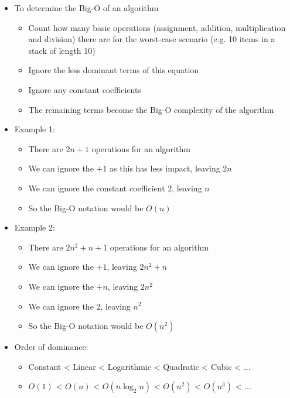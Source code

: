 \begin{itemize}
  \item To determine the Big-O of an algorithm
  \begin{itemize}
    \item Count how many basic operations (assignment, addition, multiplication and division) there are for the worst-case scenario (e.g. 10 items in a stack of length 10)
    \item Ignore the less dominant terms of this equation
    \item Ignore any constant coefficients
    \item The remaining terms become the Big-O complexity of the algorithm
  \end{itemize}
  \item Example 1:
  \begin{itemize}
    \item There are $2n + 1$ operations for an algorithm
    \item We can ignore the $+ 1$ as this has less impact, leaving $2n$
    \item We can ignore the constant coefficient $2$, leaving $n$
    \item So the Big-O notation would be $O(n)$
  \end{itemize}
  \item Example 2:
  \begin{itemize}
    \item There are $2n^2 + n + 1$ operations for an algorithm
    \item We can ignore the $+ 1$, leaving $2n^2 + n$
    \item We can ignore the $+ n$, leaving $2n^2$
    \item We can ignore the $2$, leaving $n^2$
    \item So the Big-O notation would be $O(n^2)$
  \end{itemize}
  \item Order of dominance:
  \begin{itemize}
    \item Constant < Linear < Logarithmic < Quadratic < Cubic < ...
    \item $O(1)$ < $O(n)$ < $O(n\log_2 n)$ < $O(n^2)$ < $O(n^3)$ < ...
  \end{itemize}
\end{itemize}